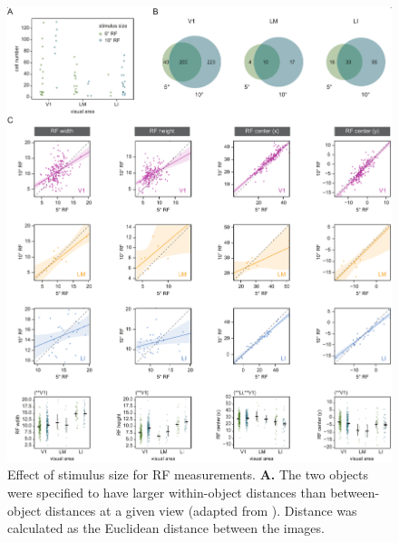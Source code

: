 \begin{figure}[t!]
\includegraphics[width=\textwidth]{figures/supplemental/fig_s6_rf5_v_rf10/fig_sX_rf5_rf10.pdf}
    \vspace{.1in}
    \caption[RF mapping stimuli]{Effect of stimulus size for RF measurements.
    \textbf{A.} The two objects were specified to have larger within-object distances than between-object distances at a given view (adapted from \cite{Zoccolan2009}). Distance was calculated as the Euclidean distance between the images. 
    \label{supfig:rf5_rf10}}
\end{figure}


